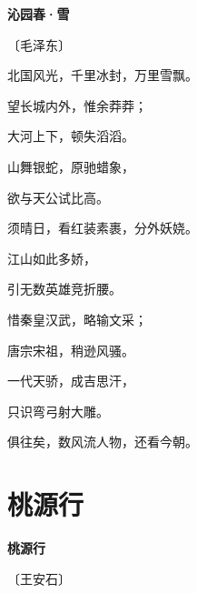 \documentclass[12pt,UTF-8,openany,fontset=none]{ctexbook}
\begin{document}
\begin{center}
    {\bfseries 沁园春·雪}

    \vspace{18pt}

    \begin{large}\xuwen
        〔毛泽东〕
    \end{large}

\end{center}

    \vspace{18pt}  %

\begin{center}
    \begin{Large}

        北国风光，千里冰封，万里雪飘。

        望长城内外，惟余莽莽；

        大河上下，顿失滔滔。

        山舞银蛇，原驰蜡象，

        欲与天公试比高。

        须晴日，看红装素裹，分外妖娆。

        \vspace{18pt}  %

        江山如此多娇，

        引无数英雄竞折腰。

        惜秦皇汉武，略输文采；

        唐宗宋祖，稍逊风骚。

        一代天骄，成吉思汗，

        只识弯弓射大雕。

        俱往矣，数风流人物，还看今朝。

    \end{Large}

\end{center}

\vspace{8pt}
\clearpage

\section{桃源行}


\begin{center}
    {\bfseries 桃源行}

    \vspace{18pt}

    \begin{large}\xuwen
        〔王安石〕
    \end{large}

\end{center}
\end{document}
